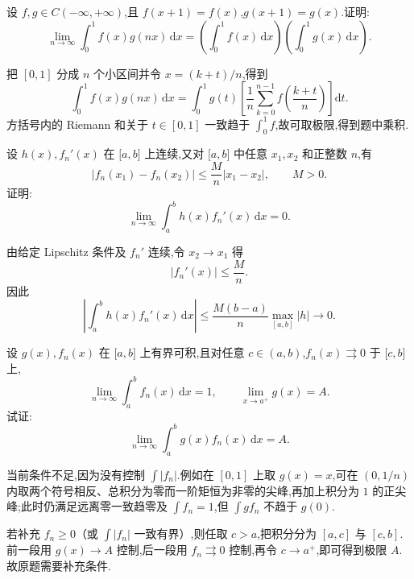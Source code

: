 \begin{example}
    设 $f,g\in C(-\infty,+\infty)$,且 $f(x+1)=f(x)$,$g(x+1)=g(x)$.证明:
    \[
        \lim\limits_{n\to\infty}\int_0^1f(x)g(nx)\,\mathrm{d}x
        =\left(\int_0^1f(x)\,\mathrm{d}x\right)
        \left(\int_0^1g(x)\,\mathrm{d}x\right).
    \]
\end{example}
\exampleblank

\begin{solution}
    把 $[0,1]$ 分成 $n$ 个小区间并令 $x=(k+t)/n$,得到
    \[
        \int_0^1f(x)g(nx)\,\mathrm{d}x
        =\int_0^1g(t)\left[\dfrac{1}{n}\sum\limits_{k=0}^{n-1}f\left(\dfrac{k+t}{n}\right)\right]\mathrm{d}t.
    \]
    方括号内的 Riemann 和关于 $t\in[0,1]$ 一致趋于 $\int_0^1f$,故可取极限,得到题中乘积.
\end{solution}

\begin{example}
    设 $h(x),f_n'(x)$ 在 $\lbrack a,b\rbrack$ 上连续,又对 $\lbrack a,b\rbrack$ 中任意 $x_1,x_2$ 和正整数 $n$,有
    \[
        |f_n(x_1)-f_n(x_2)|\leq\dfrac{M}{n}|x_1-x_2|,
        \qquad M>0.
    \]
    证明:
    \[
        \lim\limits_{n\to\infty}\int_a^bh(x)f_n'(x)\,\mathrm{d}x=0.
    \]
\end{example}
\exampleblank

\begin{solution}
    由给定 Lipschitz 条件及 $f_n'$ 连续,令 $x_2\to x_1$ 得
    \[
        |f_n'(x)|\leq\dfrac{M}{n}.
    \]
    因此
    \[
        \left|\int_a^bh(x)f_n'(x)\,\mathrm{d}x\right|
        \leq\dfrac{M(b-a)}n\max_{[a,b]}|h|\longrightarrow0.
    \]
\end{solution}

\begin{example}
    设 $g(x),f_n(x)$ 在 $\lbrack a,b\rbrack$ 上有界可积,且对任意 $c\in(a,b)$,$f_n(x)\rightrightarrows0$ 于 $\lbrack c,b\rbrack$ 上,
    \[
        \lim\limits_{n\to\infty}\int_a^bf_n(x)\,\mathrm{d}x=1,
        \qquad
        \lim\limits_{x\to a^+}g(x)=A.
    \]
    试证:
    \[
        \lim\limits_{n\to\infty}\int_a^bg(x)f_n(x)\,\mathrm{d}x=A.
    \]
\end{example}
\exampleblank

\begin{solution}
    当前条件不足,因为没有控制 $\int|f_n|$.例如在 $[0,1]$ 上取 $g(x)=x$,可在 $(0,1/n)$ 内取两个符号相反、总积分为零而一阶矩恒为非零的尖峰,再加上积分为 $1$ 的正尖峰;此时仍满足远离零一致趋零及 $\int f_n=1$,但 $\int gf_n$ 不趋于 $g(0)$.

    若补充 $f_n\geq0$（或 $\int|f_n|$ 一致有界）,则任取 $c>a$,把积分分为 $[a,c]$ 与 $[c,b]$.前一段用 $g(x)\to A$ 控制,后一段用 $f_n\rightrightarrows0$ 控制,再令 $c\to a^+$,即可得到极限 $A$.故原题需要补充条件.
\end{solution}

